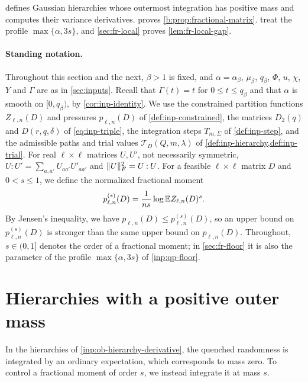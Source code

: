  defines Gaussian hierarchies whose outermost integration has positive mass and computes their variance derivatives.  proves \cref{b:prop:fractional-matrix}.  treat the profile $\max\{\alpha,3s\}$, and \cref{sec:fr-local} proves \cref{lem:fr-local-gap}.

\paragraph{Standing notation.} Throughout this section and the next, $\beta>1$ is fixed, and $\alpha=\alpha_\beta$, $\mu_\beta$, $q_\beta$, $\Phi$, $u$, $\chi$, $Y$ and $\Gamma$ are as in \cref{sec:inputs}. Recall that $\Gamma(t)=t$ for $0\le t\le q_\beta$ and that $\alpha$ is smooth on $[0,q_\beta)$, by \cref{cor:inp-identity}. We use the constrained partition functions $Z_{\ell,n}(D)$ and pressures $p_{\ell,n}(D)$ of \cref{def:inp-constrained}, the matrices $D_2(q)$ and $D(r,q,\delta)$ of \eqref{eq:inp-triple}, the integration steps $T_{m,\Sigma}$ of \cref{def:inp-step}, and the admissible paths and trial values $\mathcal T_D(Q,m,\lambda)$ of \cref{def:inp-hierarchy,def:inp-trial}. For real $\ell\times\ell$ matrices $U,U'$, not necessarily symmetric, $U\mathbin{:}U'=\sum_{a,a'}U_{aa'}U'_{aa'}$ and $\lVert U\rVert_F^2=U\mathbin{:}U$. For a feasible $\ell\times\ell$ matrix $D$ and $0<s\le1$, we define the normalized fractional moment
\begin{equation}\label{eq:fr-moment}
 p^{(s)}_{\ell,n}(D)=\frac1{ns}\log\mathbb E Z_{\ell,n}(D)^s.
\end{equation}
By Jensen's inequality, we have $p_{\ell,n}(D)\le p^{(s)}_{\ell,n}(D)$, so an upper bound on $p^{(s)}_{\ell,n}(D)$ is stronger than the same upper bound on $p_{\ell,n}(D)$. Throughout, $s\in(0,1]$ denotes the order of a fractional moment; in \cref{sec:fr-floor} it is also the parameter of the profile $\max\{\alpha,3s\}$ of \cref{inp:qp-floor}.

\section{Hierarchies with a positive outer mass}\label{sec:fr-hierarchy}

In the hierarchies of \cref{inp:ob-hierarchy-derivative}, the quenched randomness is integrated by an ordinary expectation, which corresponds to mass zero. To control a fractional moment of order $s$, we instead integrate it at mass $s$.

